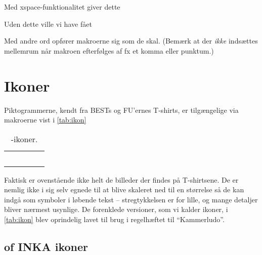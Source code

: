 \documentclass[a4paper,article,oneside,danish]{memoir}
\newcommand{\pakkenavn}[1]{\textsf{#1}}
\newcommand{\vismakro}[2][]{\cmdprint{#2} & #1#2}
\newcommand{\mdframedinputminted}[2]{\begin{mdframed}[style=kodestyle]\inputminted{#1}{#2}\end{mdframed}}
\begin{document}
\mdframedinputminted{latex}{eksempel-xspace.tex}
Med \pakkenavn{xspace}-funktionalitet giver dette
\begin{resultat}

\end{resultat}  
Uden dette ville vi have fået
{%
\let\xspace\relax %
\begin{resultat}

\end{resultat}
}
\noindent Med andre ord opfører makroerne sig som de skal. (Bemærk at
der \emph{ikke} indsættes mellemrum når makroen efterfølges af fx et
komma eller punktum.)

\section{Ikoner}
\label{sec:ikoner}

Piktogrammerne, kendt fra BESTs og FU'ernes T-shirts, er tilgængelige
via makroerne vist i \vref{tab:ikon}
\begin{table}[hbt]
  \centering
  \caption{\TK-ikoner.}
  \label{tab:ikon}
  \begin{tabularx}{.7\textwidth}{l Y Z l Y}
    \vismakro{\ikonFORM} && \vismakro{\ikonNF} \\
    \vismakro{\ikonCERM} && \vismakro{\ikonVC} \\
    \vismakro{\ikonSEKR} && \vismakro{\ikonPR} \\
    \vismakro{\ikonKASS} && \vismakro{\ikonINKA} \\
    \vismakro{\ikonFU}
  \end{tabularx}
\end{table}

Faktisk er ovenstående ikke helt de billeder der findes på
T-shirtsene. De er nemlig ikke i sig selv egnede til at blive skaleret
ned til en størrelse så de kan indgå som symboler i løbende tekst --
stregtykkelsen er for lille, og mange detaljer bliver nærmest
usynlige. De forenklede versioner, som vi kalder ikoner, i
\vref{tab:ikon} blev oprindelig lavet til brug i regelhæftet til
\enquote{Kammerludo}.

\subsection{\KASSpdf of INKA ikoner}
\label{sec:kass-og-inka}
\end{document}
